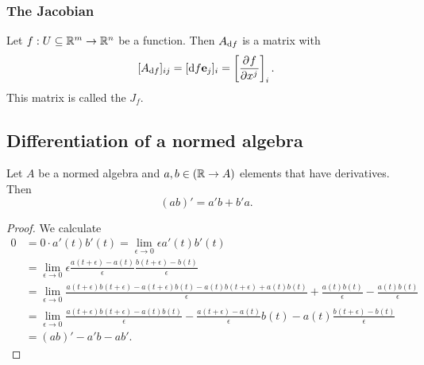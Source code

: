 \subsubsection{The Jacobian}
\begin{definition}
Let $f:U\subseteq\mathbb{R}^m\to\mathbb{R}^n$ be a function. Then $A_{\operatorname{d \!}{f}}$ is a matrix with
\[ [A_{\operatorname{d \!}{f}}]_{ij} = [\operatorname{d \!}{f}\boldsymbol{\mathrm{e}}_j]_i = \left[ \frac{\partial{^{}}f}{\partial{{x^j}^{}}} \right]_i. \]
This matrix is called the  $J_f$.
\end{definition}


\subsection{Differentiation of a normed algebra}

\begin{proposition}
Let $A$ be a normed algebra and $a,b\in (\mathbb{R} \to A)$ elements that have derivatives. Then
\[ (ab)' = a'b + b'a. \]
\end{proposition}
\begin{proof}
We calculate
\begin{align*}
0 &= 0\cdot a'(t)b'(t) = \lim_{\epsilon \to 0} \epsilon a'(t)b'(t) \\
&= \lim_{\epsilon \to 0} \epsilon \frac{a(t+\epsilon) - a(t)}{\epsilon}\frac{b(t+\epsilon) - b(t)}{\epsilon} \\
&= \lim_{\epsilon \to 0}\frac{a(t+\epsilon)b(t+\epsilon) - a(t+\epsilon)b(t) - a(t)b(t+\epsilon) + a(t)b(t)}{\epsilon} + \frac{a(t)b(t)}{\epsilon} - \frac{a(t)b(t)}{\epsilon} \\
&= \lim_{\epsilon \to 0} \frac{a(t+\epsilon)b(t+\epsilon) - a(t)b(t)}{\epsilon} - \frac{a(t+\epsilon) - a(t)}{\epsilon}b(t) - a(t)\frac{b(t+\epsilon) - b(t)}{\epsilon} \\
&= (ab)' - a'b - ab'.
\end{align*}
\end{proof}

